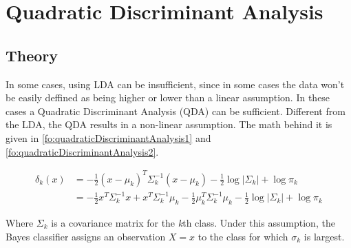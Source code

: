 \section{Quadratic Discriminant Analysis}
\subsection{Theory}
In some cases, using LDA can be insufficient, since in some cases the data won't be easily deffined as being higher or lower than a linear assumption. In these cases a Quadratic Discriminant Analysis (QDA) can be sufficient. Different from the LDA, the QDA results in a non-linear assumption. The math behind it is given in \ref{fo:quadraticDiscriminantAnalysis1} and \ref{fo:quadraticDiscriminantAnalysis2}.

\begin{align}\label{fo:quadraticDiscriminantAnalysis1}
\delta_k(x) &= - \frac{1}{2} (x - \mu_k)^T \Sigma_{k}^{-1} (x - \mu_k) - \frac{1}{2} \log|\Sigma_{k}| + \log\pi_k\\
			\label{fo:quadraticDiscriminantAnalysis2}
			&= - \frac{1}{2} x^T \Sigma_{k}^{-1} x + x^T \Sigma_{k}^{-1} \mu_k - \frac{1}{2} \mu_k^T \Sigma_{k}^{-1} \mu_k - \frac{1}{2} \log|\Sigma_{k}| + \log\pi_k
\end{align}

Where $\Sigma_{k}$ is a covariance matrix for the \textit{k}th class. Under this assumption, the Bayes classifier assigns an observation $X = x$ to the class for which $\sigma_k$ is largest.

